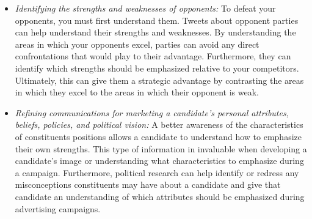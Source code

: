 \documentclass[a4paper,11pt]{article}
\begin{document}
\begin{itemize}
    \item \textit{Identifying the strengths and weaknesses of opponents:} To defeat your opponents, you must first understand them. Tweets about opponent parties can help understand their strengths and weaknesses. By understanding the areas in which your opponents excel, parties can avoid any direct confrontations that would play to their advantage. Furthermore, they can identify which strengths should be emphasized relative to your competitors. Ultimately, this can give them a strategic advantage by contrasting the areas in which they excel to the areas in which their opponent is weak.
    
    \item \textit{Refining communications for marketing a candidate’s personal attributes, beliefs, policies, and political vision:} A better awareness of the characteristics of constituents positions allows a candidate to understand how to emphasize their own strengths. This type of information in invaluable when developing a candidate’s image or understanding what characteristics to emphasize during a campaign.  Furthermore, political research can help identify or redress any misconceptions constituents may have about a candidate and give that candidate an understanding of which attributes should be emphasized during advertising campaigns.

\end{itemize}
\end{document}
